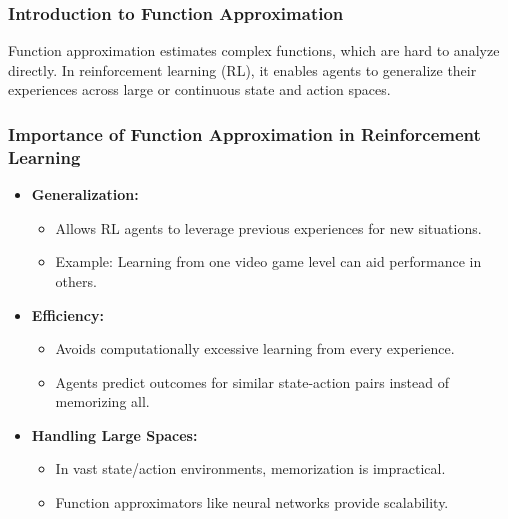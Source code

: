 \documentclass[aspectratio=169]{beamer}
\begin{document}
\frame{\titlepage}

\begin{frame}[fragile]
    \frametitle{Introduction to Function Approximation}
    Function approximation estimates complex functions, which are hard to analyze directly. 
    In reinforcement learning (RL), it enables agents to generalize their experiences across large or continuous state and action spaces.
\end{frame}

\begin{frame}[fragile]
    \frametitle{Importance of Function Approximation in Reinforcement Learning}
    \begin{itemize}
        \item \textbf{Generalization:}
        \begin{itemize}
            \item Allows RL agents to leverage previous experiences for new situations.
            \item Example: Learning from one video game level can aid performance in others.
        \end{itemize}
        
        \item \textbf{Efficiency:}
        \begin{itemize}
            \item Avoids computationally excessive learning from every experience.
            \item Agents predict outcomes for similar state-action pairs instead of memorizing all.
        \end{itemize}
        
        \item \textbf{Handling Large Spaces:}
        \begin{itemize}
            \item In vast state/action environments, memorization is impractical.
            \item Function approximators like neural networks provide scalability.
        \end{itemize}
    \end{itemize}
\end{frame}
\end{document}
